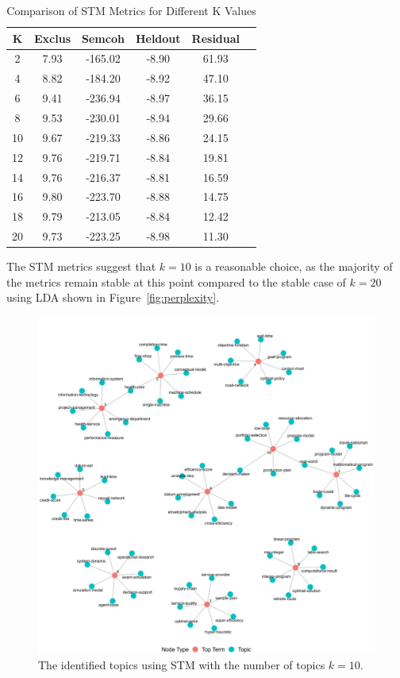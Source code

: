 \documentclass[9pt,twocolumn,twoside]{pnas-new}
\begin{document}
\begin{table}[!htbp]
\centering
\caption{Comparison of STM Metrics for Different K Values}
\begin{tabular}{cccccc}
\toprule
\textbf{K} & \textbf{Exclus} & \textbf{Semcoh} & \textbf{Heldout} & \textbf{Residual} \\
\midrule
2  & 7.93 & -165.02 & -8.90 & 61.93 \\
4  & 8.82 & -184.20 & -8.92 & 47.10 \\
6  & 9.41 & -236.94 & -8.97 & 36.15 \\
8  & 9.53 & -230.01 & -8.94 & 29.66 \\
10 & 9.67 & -219.33 & -8.86 & 24.15 \\
12 & 9.76 & -219.71 & -8.84 & 19.81 \\
14 & 9.76 & -216.37 & -8.81 & 16.59 \\
16 & 9.80 & -223.70 & -8.88 & 14.75 \\
18 & 9.79 & -213.05 & -8.84 & 12.42 \\
20 & 9.73 & -223.25 & -8.98 & 11.30 \\
\bottomrule
\end{tabular}
\label{tab:stm_metrics}
\end{table}

The STM metrics suggest that $k = 10$ is a reasonable choice, as the majority of the metrics remain stable at this point compared to the stable case of $k = 20$ using LDA shown in Figure~\ref{fig:perplexity}.


\begin{figure}[!tbhp]
\centering
\includegraphics[width=0.7\linewidth]{bag_words/topics_STM10.png}
\caption{The identified topics using STM with the number of topics $k = 10$.}
\label{fig:stmtopics}
\end{figure}
\end{document}
